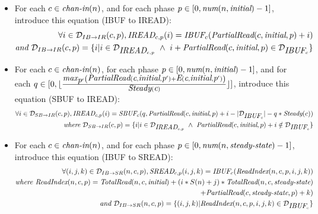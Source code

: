 \begin{itemize}
\item For each $c \in \mbox{\it chan-in}(n)$, and for each phase $p \in
[0, \mbox{\it num}(n, \mbox{\it initial})-1]$, introduce this equation (IBUF to IREAD):
\begin{align*}
\forall i \in {\cal D}_{IB \rightarrow IR}(c,p), 
\mbox{\it IREAD}_{c, p}(i) = \mbox{\it IBUF}_{c}(\mbox{\it PartialRead}(c, \mbox{\it initial}, p) + i) \\
\mbox{\it and }{\cal D}_{IB \rightarrow IR}(c,p) = 
  \{ i | i \in {\cal D}_{\mbox{\it IREAD}_{c,p}} ~\wedge~ 
         i + \mbox{\it PartialRead}(c, \mbox{\it initial}, p) \in {\cal D}_{\mbox{\it IBUF}_{c}} \}
\end{align*}

\item For each $c \in \mbox{\it chan-in}(n)$, for each phase $p \in [0,
\mbox{\it num}(n, \mbox{\it initial})-1]$, and for \\ each $q \in [0, \lfloor
\frac{\mbox{\it max}_{\mbox{\it p}'} \left( \mbox{\it PartialRead}(\mbox{\it c}, \mbox{\it initial},
\mbox{\it p}') + \mbox{\it E}(\mbox{\it c}, \mbox{\it initial}, \mbox{\it p}') \right)
}{\mbox{\it Steady}(\mbox{\it c})} \rfloor ]$, introduce this equation (SBUF to
IREAD):
\begin{align*}
\forall i \in {\cal D}_{SB \rightarrow IR}(c,p), 
\mbox{\it IREAD}_{c,p}(i) = 
    \mbox{\it SBUF}_{c}(q,
      \mbox{\it PartialRead}(c, \mbox{\it initial}, p) + i - 
            |{\cal D}_{\mbox{\it IBUF}_{c}}| - q * \mbox{\it Steady}(c)) \\
\mbox{\it where }{\cal D}_{SB \rightarrow IR}(c,p) = 
  \{ i | i \in {\cal D}_{\mbox{\it IREAD}_{c,p}} ~\wedge~ 
         \mbox{\it PartialRead}(c, \mbox{\it initial}, p) + i \notin {\cal D}_{\mbox{\it IBUF}_{c}} \}
\end{align*}

\item For each $c \in \mbox{\it chan-in}(n)$, and for each phase $p \in [0,
\mbox{\it num}(n, \mbox{\it steady-state})-1]$, introduce this equation (IBUF to
SREAD):
\begin{align*}
\forall (i,j,k) \in {\cal D}_{IB \rightarrow SR}(n,c,p), 
\mbox{\it SREAD}_{c, p}(i,j,k) = 
    \mbox{\it IBUF}_{c}(\mbox{\it ReadIndex}(n,c,p,i,j,k)) \\
\mbox{\it where ReadIndex}(n,c,p) = \mbox{\it TotalRead}(n,c,\mbox{\it initial})
                + (i*S(n)+j)*\mbox{\it TotalRead}(n,c,\mbox{\it steady-state}) \\
                + \mbox{\it PartialRead}(c, \mbox{\it steady-state}, p) 
                + k) \\
\mbox{\it and }{\cal D}_{IB \rightarrow SR}(n,c,p) = 
  \{ (i,j,k) | \mbox{\it ReadIndex}(n,c,p,i,j,k) \in {\cal D}_{\mbox{\it IBUF}_{c}} \}
\end{align*}


\end{itemize}
